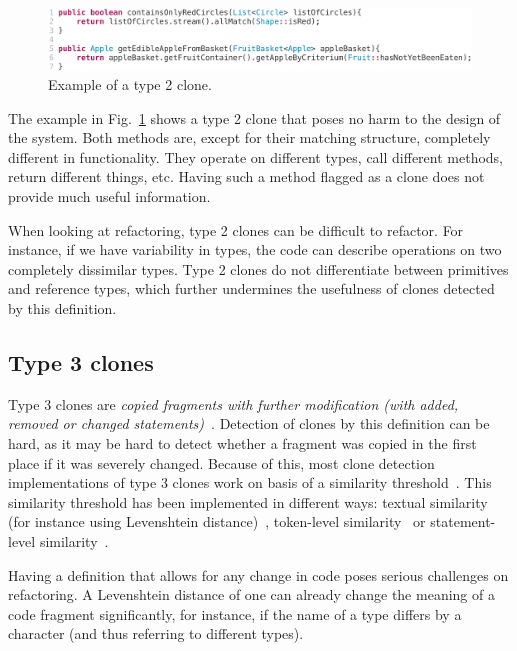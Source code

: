 \begin{figure}[H]
  \includegraphics[width=1\columnwidth]{img/type2}
  \caption{Example of a type 2 clone.}
  \label{fig:type2}
\end{figure}

The example in Fig.~\ref{fig:type2} shows a type 2 clone that poses no harm to the design of the system. Both methods are, except for their matching structure, completely different in functionality. They operate on different types, call different methods, return different things, etc. Having such a method flagged as a clone does not provide much useful information.

When looking at refactoring, type 2 clones can be difficult to refactor. For instance, if we have variability in types, the code can describe operations on two completely dissimilar types. Type 2 clones do not differentiate between primitives and reference types, which further undermines the usefulness of clones detected by this definition.

\subsection{Type 3 clones}\label{sec:type3}
Type 3 clones are \textit{copied fragments with further modification (with added, removed or changed statements)}~\cite{roy2007survey}. Detection of clones by this definition can be hard, as it may be hard to detect whether a fragment was copied in the first place if it was severely changed. Because of this, most clone detection implementations of type 3 clones work on basis of a similarity threshold~\cite{roy2008nicad,ragkhitwetsagul2019siamese,jiang2007deckard,semura2017ccfindersw}. This similarity threshold has been implemented in different ways: textual similarity (for instance using Levenshtein distance)~\cite{lavoie2011automated}, token-level similarity~\cite{sajnani2016sourcerercc} or statement-level similarity~\cite{kamalpriya2017enhancing}.

Having a definition that allows for any change in code poses serious challenges on refactoring. A Levenshtein distance of one can already change the meaning of a code fragment significantly, for instance, if the name of a type differs by a character (and thus referring to different types).

